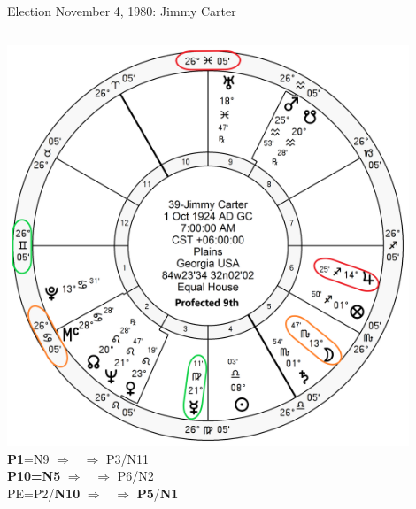 \begin{frame}[t]{Election November 4, 1980: Jimmy Carter}
\begin{columns}[T, onlytextwidth]
\vspace{-1em}
{\includegraphics[width=0.9\textwidth]{charts/Carter-Prof-9th.png}}
\fontsize{8pt}{9pt}\selectfont
\textbf{\dgreen P1}=N9
	$\Rightarrow$ \Mercury\, $\Rightarrow$ P3/N11\\
\textbf{\red P10=N5}
	$\Rightarrow$ \Jupiter\, $\Rightarrow$ P6/N2\\
PE=P2/\textbf{\red N10}
	 $\Rightarrow$ \Moon\, $\Rightarrow$ \textbf{\red P5}/\textbf{\dgreen N1}

\end{columns}
\end{frame}
